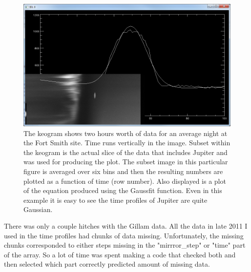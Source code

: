 \documentclass[11pt]{article}
\begin{document}
\begin{figure}[t]
\includegraphics[scale=0.65]{fortsmith_1106_timeprofile.jpg}
\caption{The keogram shows two hours worth of data for an average night at the Fort Smith site. Time runs vertically in the image. Subset within the keogram is the actual slice of the data that includes Jupiter and was used for producing the plot. The subset image in this particular figure is averaged over six bins and then the resulting numbers are plotted as a function of time (row number). Also displayed is a plot of the equation produced using the Gaussfit function. Even in this example it is easy to see the time profiles of Jupiter are quite Gaussian.}
\end{figure}


There was only a couple hitches with the Gillam data. All the data in late 2011 I used in the time profiles had chunks of data missing. Unfortunately, the missing chunks corresponded to either steps missing in the "mirrror\_step" or "time" part of the array. So a lot of time was spent making a code that checked both and then selected which part correctly predicted amount of missing data.  
\end{document}
